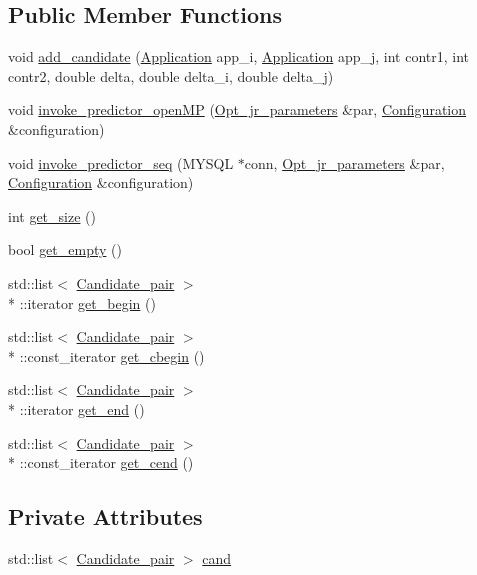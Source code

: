\subsection*{Public Member Functions}
\begin{DoxyCompactItemize}
\item 
void \hyperlink{classCandidates_ad76cf8f7ae979cc49afd67b5fc9c702b}{add\-\_\-candidate} (\hyperlink{classApplication}{Application} app\-\_\-i, \hyperlink{classApplication}{Application} app\-\_\-j, int contr1, int contr2, double delta, double delta\-\_\-i, double delta\-\_\-j)
\item 
void \hyperlink{classCandidates_a9cc75e29ad2d0f2eb29fae2801c8e58b}{invoke\-\_\-predictor\-\_\-open\-M\-P} (\hyperlink{classOpt__jr__parameters}{Opt\-\_\-jr\-\_\-parameters} \&par, \hyperlink{classConfiguration}{Configuration} \&configuration)
\item 
void \hyperlink{classCandidates_a0f5bfe459063108d80ed8dce02c6c07b}{invoke\-\_\-predictor\-\_\-seq} (M\-Y\-S\-Q\-L $\ast$conn, \hyperlink{classOpt__jr__parameters}{Opt\-\_\-jr\-\_\-parameters} \&par, \hyperlink{classConfiguration}{Configuration} \&configuration)
\item 
int \hyperlink{classCandidates_ac10d9fe35730800bacac1d89ab117a4c}{get\-\_\-size} ()
\item 
bool \hyperlink{classCandidates_aaba3941ba950a669776a1e53fb710691}{get\-\_\-empty} ()
\item 
std\-::list$<$ \hyperlink{classCandidate__pair}{Candidate\-\_\-pair} $>$\\*
\-::iterator \hyperlink{classCandidates_a69a3001a09b54813959d2b44662f7f18}{get\-\_\-begin} ()
\item 
std\-::list$<$ \hyperlink{classCandidate__pair}{Candidate\-\_\-pair} $>$\\*
\-::const\-\_\-iterator \hyperlink{classCandidates_a9fb1fe0a56d70f0f0f4243cd7e32448a}{get\-\_\-cbegin} ()
\item 
std\-::list$<$ \hyperlink{classCandidate__pair}{Candidate\-\_\-pair} $>$\\*
\-::iterator \hyperlink{classCandidates_ad763ac469728621a81010ca7c14b4246}{get\-\_\-end} ()
\item 
std\-::list$<$ \hyperlink{classCandidate__pair}{Candidate\-\_\-pair} $>$\\*
\-::const\-\_\-iterator \hyperlink{classCandidates_a4c865dc532a6ead85200c7b66434bf71}{get\-\_\-cend} ()
\end{DoxyCompactItemize}
\subsection*{Private Attributes}
\begin{DoxyCompactItemize}
\item 
std\-::list$<$ \hyperlink{classCandidate__pair}{Candidate\-\_\-pair} $>$ \hyperlink{classCandidates_a45b43ae5f71d2162f591e4019f1bc560}{cand}
\end{DoxyCompactItemize}


